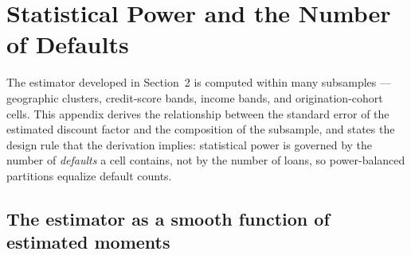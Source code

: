 %

\section{Statistical Power and the Number of Defaults}\label{appendix:power}

The estimator developed in Section~2 is computed within many subsamples --- geographic clusters, credit-score bands, income bands, and origination-cohort cells. This appendix derives the relationship between the standard error of the estimated discount factor and the composition of the subsample, and states the design rule that the derivation implies: statistical power is governed by the number of \emph{defaults} a cell contains, not by the number of loans, so power-balanced partitions equalize default counts.

\subsection{The estimator as a smooth function of estimated moments}

